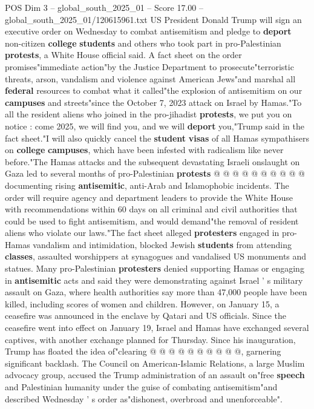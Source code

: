\begin{textsample}{POS Dim 3 – global\_south\_2025\_01 – Score 17.00 – global\_south\_2025\_01/120615961.txt}  \label{ex:f3_pos_379}
US President Donald Trump will sign an executive order on Wednesday to combat antisemitism and pledge to \textbf{deport} non-citizen \textbf{college} \textbf{students} and others who took part in pro-Palestinian \textbf{protests}, a White House official said.
A fact sheet on the order promises"immediate action"by the Justice Department to prosecute"terroristic threats, arson, vandalism and violence against American Jews"and marshal all \textbf{federal} resources to combat what it called"the explosion of antisemitism on our \textbf{campuses} and streets"since the October 7, 2023 attack on Israel by Hamas."To all the resident aliens who joined in the pro-jihadist \textbf{protests}, we put you on notice : come 2025, we will find you, and we will \textbf{deport} you,"Trump said in the fact sheet."I will also quickly cancel the \textbf{student} \textbf{visas} of all Hamas sympathisers on \textbf{college} \textbf{campuses}, which have been infested with radicalism like never before."The Hamas attacks and the subsequent devastating Israeli onslaught on Gaza led to several months of pro-Palestinian \textbf{protests} @ @ @ @ @ @ @ @ @ @ documenting rising \textbf{antisemitic}, anti-Arab and Islamophobic incidents.
The order will require agency and department leaders to provide the White House with recommendations within 60 days on all criminal and civil authorities that could be used to fight antisemitism, and would demand"the removal of resident aliens who violate our laws."The fact sheet alleged \textbf{protesters} engaged in pro-Hamas vandalism and intimidation, blocked Jewish \textbf{students} from attending \textbf{classes}, assaulted worshippers at synagogues and vandalised US monuments and statues.
Many pro-Palestinian \textbf{protesters} denied supporting Hamas or engaging in \textbf{antisemitic} acts and said they were demonstrating against Israel ' s military assault on Gaza, where health authorities say more than 47,000 people have been killed, including scores of women and children.
However, on January 15, a ceasefire was announced in the enclave by Qatari and US officials.
Since the ceasefire went into effect on January 19, Israel and Hamas have exchanged several captives, with another exchange planned for Thursday.
Since his inauguration, Trump has floated the idea of"clearing @ @ @ @ @ @ @ @ @ @, garnering significant backlash.
The Council on American-Islamic Relations, a large Muslim advocacy group, accused the Trump administration of an assault on"free \textbf{speech} and Palestinian humanity under the guise of combating antisemitism"and described Wednesday ' s order as"dishonest, overbroad and unenforceable".

\end{textsample}
